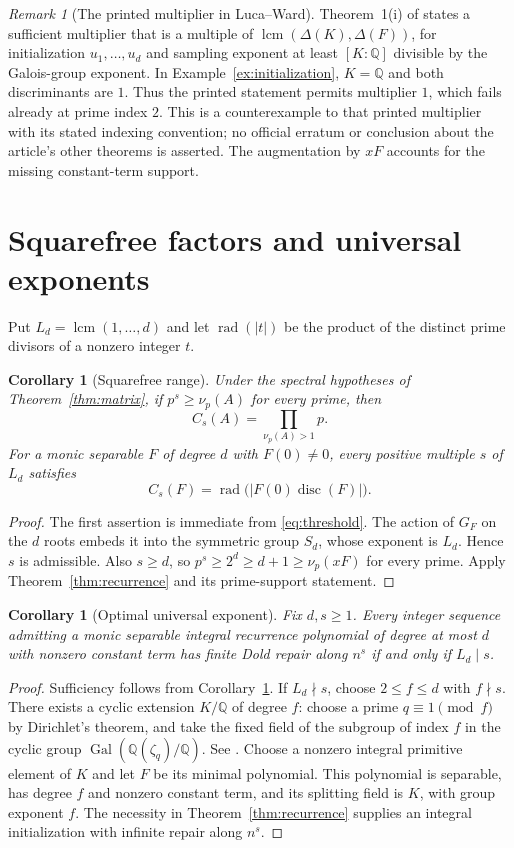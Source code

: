 \documentclass[11pt]{article}
\newtheorem{corollary}[theorem]{Corollary}
\theoremstyle{remark}
\newtheorem{remark}[theorem]{Remark}
\newcommand{\rad}{\operatorname{rad}}
\newcommand{\disc}{\operatorname{disc}}
\newcommand{\lcm}{\operatorname{lcm}}
\newcommand{\Gal}{\operatorname{Gal}}
\newcommand{\Q}{\mathbb Q}
\begin{document}
\begin{remark}[The printed multiplier in Luca--Ward]\label{rem:LW}
Theorem~1(i) of \cite{LW} states a sufficient multiplier that is a multiple of $\lcm(\Delta(K),\Delta(F))$, for initialization $u_1,\ldots,u_d$ and sampling exponent at least $[K:\Q]$ divisible by the Galois-group exponent. In Example~\ref{ex:initialization}, $K=\Q$ and both discriminants are $1$. Thus the printed statement permits multiplier $1$, which fails already at prime index $2$. This is a counterexample to that printed multiplier with its stated indexing convention; no official erratum or conclusion about the article's other theorems is asserted. The augmentation by $xF$ accounts for the missing constant-term support.
\end{remark}

\section{Squarefree factors and universal exponents}
Put $L_d=\lcm(1,\ldots,d)$ and let $\rad(|t|)$ be the product of the distinct prime divisors of a nonzero integer $t$.

\begin{corollary}[Squarefree range]\label{cor:squarefree}
Under the spectral hypotheses of Theorem~\ref{thm:matrix}, if $p^s\geq\nu_p(A)$ for every prime, then
\[
 C_s(A)=\prod_{\nu_p(A)>1}p.
\]
For a monic separable $F$ of degree $d$ with $F(0)\neq0$, every positive multiple $s$ of $L_d$ satisfies
\[
 C_s(F)=\rad\bigl(|F(0)\disc(F)|\bigr).
\]
\end{corollary}
\begin{proof}
The first assertion is immediate from \eqref{eq:threshold}. The action of $G_F$ on the $d$ roots embeds it into the symmetric group $S_d$, whose exponent is $L_d$. Hence $s$ is admissible. Also $s\geq d$, so $p^s\geq2^d\geq d+1\geq\nu_p(xF)$ for every prime. Apply Theorem~\ref{thm:recurrence} and its prime-support statement.
\end{proof}

\begin{corollary}[Optimal universal exponent]\label{cor:universal}
Fix $d,s\geq1$. Every integer sequence admitting a monic separable integral recurrence polynomial of degree at most $d$ with nonzero constant term has finite Dold repair along $n^s$ if and only if $L_d\mid s$.
\end{corollary}
\begin{proof}
Sufficiency follows from Corollary~\ref{cor:squarefree}. If $L_d\nmid s$, choose $2\leq f\leq d$ with $f\nmid s$. There exists a cyclic extension $K/\Q$ of degree $f$: choose a prime $q\equiv1\pmod f$ by Dirichlet's theorem, and take the fixed field of the subgroup of index $f$ in the cyclic group $\Gal(\Q(\zeta_q)/\Q)$. See \cite[Sections~6 and~8]{Milne}. Choose a nonzero integral primitive element of $K$ and let $F$ be its minimal polynomial. This polynomial is separable, has degree $f$ and nonzero constant term, and its splitting field is $K$, with group exponent $f$. The necessity in Theorem~\ref{thm:recurrence} supplies an integral initialization with infinite repair along $n^s$.
\end{proof}
\end{document}
